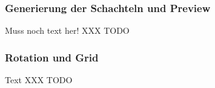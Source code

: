 \subsubsection{Generierung der Schachteln und Preview}
\label{subsubsec:generierungPreview}
Muss noch text her! XXX TODO


\subsubsection{Rotation und Grid}
\label{subsubsec:rotationGrid}
Text XXX TODO